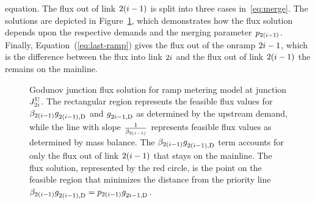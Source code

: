 equation. The flux out of link $2(i-1)$ is split into three cases
in~\eqref{eq:merge}. The solutions are depicted in Figure~\ref{fig:Godunov-junction-flux},
which demonstrates how the flux solution depends upon the respective
demands and the merging parameter $p_{2\left(\link-1\right)}$. Finally,
Equation~(\eqref{eq:last-ramp}) gives the flux out of the onramp $2i-1$,
which is the difference between the flux into link $2i$ and the
flux out of link $2\left(\link-1\right)$ the remains on the mainline.
\begin{figure}
\hfill{}\hfill{}

\caption{Godunov junction flux solution for ramp metering model at junction
$J_{2i}^{\text{U}}$. The rectangular region represents the feasible flux
values for $\splitratio_{2\left(\link-1\right)}\fout{2\left(\link-1\right)}{}$
and $g_{2i-1,\text{D}}^{}$ as determined by the upstream demand, while
the line with slope\label{fig:Godunov-junction-flux} $\frac{1}{\splitratio_{2\left(\link-1\right)}}$
represents feasible flux values as determined by mass balance. The
$\splitratio_{2\left(\link-1\right)}\fout{2\left(\link-1\right)}{}$
term accounts for only the flux out of link $2\left(\link-1\right)$
that stays on the mainline. The flux solution, represented by the
red circle, is the point on the feasible region that minimizes the
distance from the priority line $\splitratio_{2\left(\link-1\right)}\fout{2\left(\link-1\right)}{}=p_{2(\link-1)}\fout{2\link-1}{}$.}
\end{figure}


